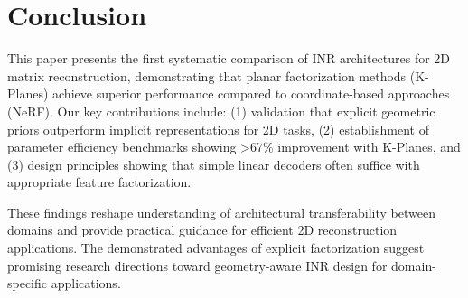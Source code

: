 \documentclass{article}
\begin{document}
\section{Conclusion}

This paper presents the first systematic comparison of INR architectures for 2D matrix reconstruction, demonstrating that planar factorization methods (K-Planes) achieve superior performance compared to coordinate-based approaches (NeRF). Our key contributions include: (1) validation that explicit geometric priors outperform implicit representations for 2D tasks, (2) establishment of parameter efficiency benchmarks showing >67\% improvement with K-Planes, and (3) design principles showing that simple linear decoders often suffice with appropriate feature factorization.

These findings reshape understanding of architectural transferability between domains and provide practical guidance for efficient 2D reconstruction applications. The demonstrated advantages of explicit factorization suggest promising research directions toward geometry-aware INR design for domain-specific applications.



\end{document}
